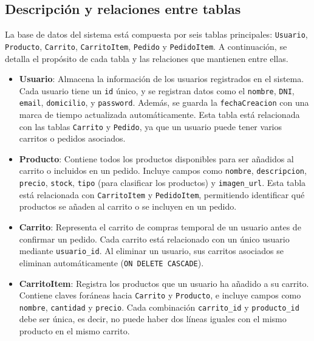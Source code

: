\documentclass[10pt]{book}
\begin{document}
        
\subsection{Descripción y relaciones entre tablas}

    La base de datos del sistema está compuesta por seis tablas principales: \texttt{Usuario}, \texttt{Producto}, \texttt{Carrito}, \texttt{CarritoItem}, \texttt{Pedido} y \texttt{PedidoItem}. A continuación, se detalla el propósito de cada tabla y las relaciones que mantienen entre ellas.
    
    \begin{itemize}
        \item \textbf{Usuario}: Almacena la información de los usuarios registrados en el sistema. Cada usuario tiene un \texttt{id} único, y se registran datos como el \texttt{nombre}, \texttt{DNI}, \texttt{email}, \texttt{domicilio}, y \texttt{password}. Además, se guarda la \texttt{fechaCreacion} con una marca de tiempo actualizada automáticamente. Esta tabla está relacionada con las tablas \texttt{Carrito} y \texttt{Pedido}, ya que un usuario puede tener varios carritos o pedidos asociados.
        
        \item \textbf{Producto}: Contiene todos los productos disponibles para ser añadidos al carrito o incluidos en un pedido. Incluye campos como \texttt{nombre}, \texttt{descripcion}, \texttt{precio}, \texttt{stock}, \texttt{tipo} (para clasificar los productos) y \texttt{imagen\_url}. Esta tabla está relacionada con \texttt{CarritoItem} y \texttt{PedidoItem}, permitiendo identificar qué productos se añaden al carrito o se incluyen en un pedido.
        
        \item \textbf{Carrito}: Representa el carrito de compras temporal de un usuario antes de confirmar un pedido. Cada carrito está relacionado con un único usuario mediante \texttt{usuario\_id}. Al eliminar un usuario, sus carritos asociados se eliminan automáticamente (\texttt{ON DELETE CASCADE}).
        
        \item \textbf{CarritoItem}: Registra los productos que un usuario ha añadido a su carrito. Contiene claves foráneas hacia \texttt{Carrito} y \texttt{Producto}, e incluye campos como \texttt{nombre}, \texttt{cantidad} y \texttt{precio}. Cada combinación \texttt{carrito\_id} y \texttt{producto\_id} debe ser única, es decir, no puede haber dos líneas iguales con el mismo producto en el mismo carrito.
        

\end{itemize}
\end{document}
